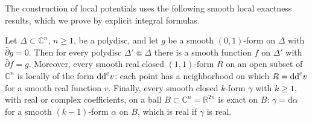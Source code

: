 The construction of local potentials uses the following smooth local exactness results, which we prove by explicit integral formulas.
\begin{lemma}\label{lem:smooth-dbar-poincare}
Let $\Delta\subset\mathbb C^n$, $n\geq1$, be a polydisc, and let $g$ be a smooth $(0,1)$-form on $\Delta$ with $\bar\partial g=0$. Then for every polydisc $\Delta'\Subset\Delta$ there is a smooth function $f$ on $\Delta'$ with $\bar\partial f=g$. Moreover, every smooth real closed $(1,1)$-form $R$ on an open subset of $\mathbb C^n$ is locally of the form $\mathrm{dd}^{\mathrm{c}} v$: each point has a neighborhood on which $R=\mathrm{dd}^{\mathrm{c}} v$ for a smooth real function $v$. Finally, every smooth closed $k$-form $\gamma$ with $k\geq1$, with real or complex coefficients, on a ball $B\subset\mathbb C^n=\mathbb R^{2n}$ is exact on $B$: $\gamma=\mathrm d\alpha$ for a smooth $(k-1)$-form $\alpha$ on $B$, which is real if $\gamma$ is real.
\end{lemma}
